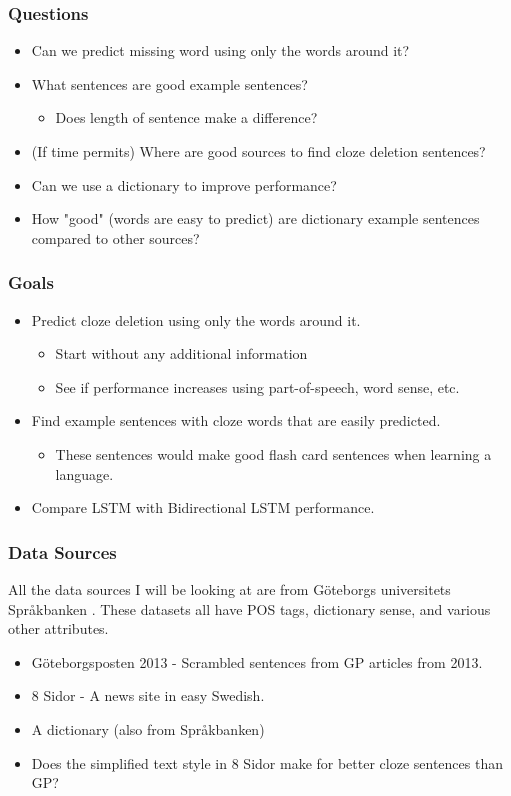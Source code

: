 \documentclass{beamer}
\begin{document}
\begin{frame}
\frametitle{Questions}
\begin{itemize}
\item <1-> Can we predict missing word using only the words around it?
\item <2-> What sentences are good example sentences?
    \begin{itemize}
        \item Does length of sentence make a difference?
    \end{itemize}
\item <3-> (If time permits) Where are good sources to find cloze deletion sentences?
\item <4-> Can we use a dictionary to improve performance?
\item <5-> How "good" (words are easy to predict) are dictionary example sentences compared to other sources?
\end{itemize}
\end{frame}


\begin{frame}
\frametitle{Goals}
\begin{itemize}
\item Predict cloze deletion using only the words around it.
    \begin{itemize}
        \item Start without any additional information
        \item See if performance increases using part-of-speech, word sense, etc.
    \end{itemize}
\item Find example sentences with cloze words that are easily predicted.
\begin{itemize}
    \item These sentences would make good flash card sentences when learning a language.
\end{itemize}
\item Compare LSTM with Bidirectional LSTM performance.
\end{itemize}
\end{frame}


\begin{frame}
\frametitle{Data Sources}
All the data sources I will be looking at are from Göteborgs universitets Språkbanken \cite{spraakbanken}. These datasets all have POS tags, dictionary sense, and various other attributes.
 \begin{itemize}
    \item <1-> Göteborgsposten 2013 - Scrambled sentences from GP articles from 2013.
    \item <1-> 8 Sidor - A news site in easy Swedish.
    \item <1-> A dictionary (also from Språkbanken)
    \item <2> Does the simplified text style in 8 Sidor make for better cloze sentences than GP?
\end{itemize}

\end{frame}
\end{document}
